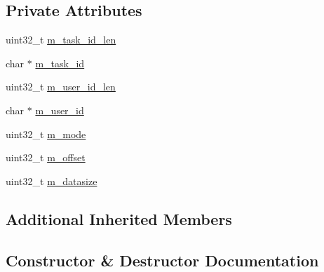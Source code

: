 \subsection*{Private Attributes}
\begin{DoxyCompactItemize}
\item 
uint32\+\_\+t \hyperlink{class_c_im_pdu_client_file_pull_data_req_a2439809a980eae3b301c01649f9ce8cd}{m\+\_\+task\+\_\+id\+\_\+len}
\item 
char $\ast$ \hyperlink{class_c_im_pdu_client_file_pull_data_req_a66d65d05a5c30df5233f8084be06bbbb}{m\+\_\+task\+\_\+id}
\item 
uint32\+\_\+t \hyperlink{class_c_im_pdu_client_file_pull_data_req_aac19e55c0dcf7d1daa0fd8afb26dfd4e}{m\+\_\+user\+\_\+id\+\_\+len}
\item 
char $\ast$ \hyperlink{class_c_im_pdu_client_file_pull_data_req_a4be523f46820cb8829cbb8a918b564d8}{m\+\_\+user\+\_\+id}
\item 
uint32\+\_\+t \hyperlink{class_c_im_pdu_client_file_pull_data_req_adeb80988de4386225b6af03b6cd16c85}{m\+\_\+mode}
\item 
uint32\+\_\+t \hyperlink{class_c_im_pdu_client_file_pull_data_req_ae7614327f218a7dd62a745a4427f7a9a}{m\+\_\+offset}
\item 
uint32\+\_\+t \hyperlink{class_c_im_pdu_client_file_pull_data_req_a5fa99853cfef6b98ad472b8f3ebd4eb8}{m\+\_\+datasize}
\end{DoxyCompactItemize}
\subsection*{Additional Inherited Members}


\subsection{Constructor \& Destructor Documentation}
\hypertarget{class_c_im_pdu_client_file_pull_data_req_a4e4cc49c1191f9ef6d9313a409ca08fb}{}
